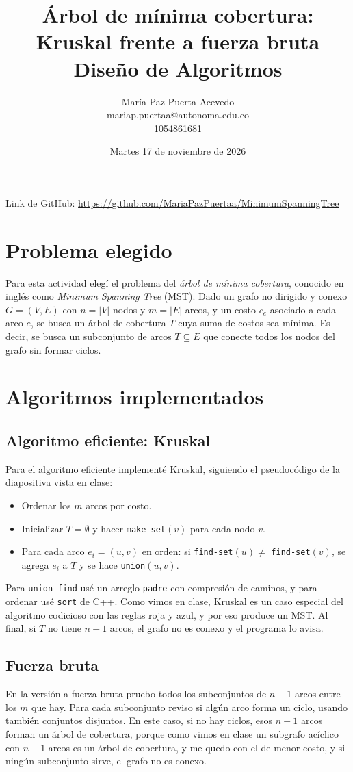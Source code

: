 \documentclass[11pt,a4paper]{article}
\title{Árbol de mínima cobertura: Kruskal frente a fuerza bruta\\\large Diseño de Algoritmos}
\author{María Paz Puerta Acevedo \\\large mariap.puertaa@autonoma.edu.co \\\large 1054861681 }
\date{Martes 17 de noviembre de 2026}
\begin{document}
\maketitle

\begin{center}
Link de GitHub: \url{https://github.com/MariaPazPuertaa/MinimumSpanningTree}
\end{center}

\section{Problema elegido}
Para esta actividad elegí el problema del \emph{árbol de mínima cobertura}, conocido en inglés como \emph{Minimum Spanning Tree} (MST). Dado un grafo no dirigido y conexo $G=(V,E)$ con $n=|V|$ nodos y $m=|E|$ arcos, y un costo $c_e$ asociado a cada arco $e$, se busca un árbol de cobertura $T$ cuya suma de costos sea mínima. Es decir, se busca un subconjunto de arcos $T\subseteq E$ que conecte todos los nodos del grafo sin formar ciclos.

\section{Algoritmos implementados}
\subsection{Algoritmo eficiente: Kruskal}
Para el algoritmo eficiente implementé Kruskal, siguiendo el pseudocódigo de la diapositiva vista en clase:
\begin{itemize}
  \item Ordenar los $m$ arcos por costo.
  \item Inicializar $T=\emptyset$ y hacer \texttt{make-set}$(v)$ para cada nodo $v$.
  \item Para cada arco $e_i=(u,v)$ en orden: si \texttt{find-set}$(u)\neq$ \texttt{find-set}$(v)$, se agrega $e_i$ a $T$ y se hace \texttt{union}$(u,v)$.
\end{itemize}
Para \texttt{union-find} usé un arreglo \texttt{padre} con compresión de caminos, y para ordenar usé \texttt{sort} de C++. Como vimos en clase, Kruskal es un caso especial del algoritmo codicioso con las reglas roja y azul, y por eso produce un MST. Al final, si $T$ no tiene $n-1$ arcos, el grafo no es conexo y el programa lo avisa.

\subsection{Fuerza bruta}
En la versión a fuerza bruta pruebo todos los subconjuntos de $n-1$ arcos entre los $m$ que hay. Para cada subconjunto reviso si algún arco forma un ciclo, usando también conjuntos disjuntos. En este caso, si no hay ciclos, esos $n-1$ arcos forman un árbol de cobertura, porque como vimos en clase un subgrafo acíclico con $n-1$ arcos es un árbol de cobertura, y me quedo con el de menor costo, y si ningún subconjunto sirve, el grafo no es conexo.
\end{document}
